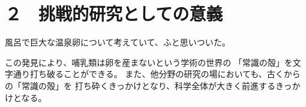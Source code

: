 
\section{２　挑戦的研究としての意義}

		風呂で巨大な温泉卵について考えていて、ふと思いついた。

	この発見により、哺乳類は卵を産まないという学術の世界の
	「常識の殻」を文字通り打ち破ることができる。
	また、他分野の研究の場においても、古くからの「常識の殻」を
	打ち砕くきっかけとなり、科学全体が大きく前進するきっかけとなる。



